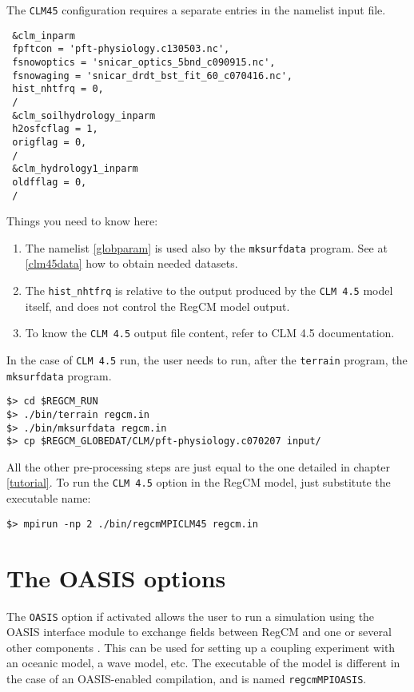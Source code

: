 The \verb=CLM45= configuration requires a separate entries in the namelist input
file.

{\footnotesize
\begin{Verbatim}
 &clm_inparm
 fpftcon = 'pft-physiology.c130503.nc',
 fsnowoptics = 'snicar_optics_5bnd_c090915.nc',
 fsnowaging = 'snicar_drdt_bst_fit_60_c070416.nc',
 hist_nhtfrq = 0,
 /
 &clm_soilhydrology_inparm
 h2osfcflag = 1,
 origflag = 0,
 /
 &clm_hydrology1_inparm
 oldfflag = 0,
 /
\end{Verbatim}
}

Things you need to know here:

\begin{enumerate}
\item The namelist \ref{globparam} is used also by the \verb=mksurfdata=
program. See at \ref{clm45data} how to obtain needed datasets.
\item The \verb=hist_nhtfrq= is relative to the output produced by the
\verb=CLM 4.5= model itself, and does not control the RegCM model output.
\item To know the \verb=CLM 4.5= output file content, refer to CLM 4.5
documentation.
\end{enumerate}

In the case of \verb=CLM 4.5= run, the user needs to run, after the
\verb=terrain= program, the \verb=mksurfdata= program.

\begin{Verbatim}
$> cd $REGCM_RUN
$> ./bin/terrain regcm.in
$> ./bin/mksurfdata regcm.in
$> cp $REGCM_GLOBEDAT/CLM/pft-physiology.c070207 input/
\end{Verbatim}

All the other pre-processing steps are just equal to the one detailed in
chapter \ref{tutorial}. To run the \verb=CLM 4.5= option in the RegCM model,
just substitute the executable name:

\begin{Verbatim}
$> mpirun -np 2 ./bin/regcmMPICLM45 regcm.in
\end{Verbatim}

\section{The OASIS options}
\label{oasis}

The \verb=OASIS= option if activated allows the user to run a simulation using
the OASIS interface module to exchange fields between RegCM and one or several
other components \citep{craig_2017}. This can be used for setting up a coupling experiment with
an oceanic model, a wave model, etc.
The executable of the model is different in the case of an OASIS-enabled
compilation, and is named \verb=regcmMPIOASIS=.

